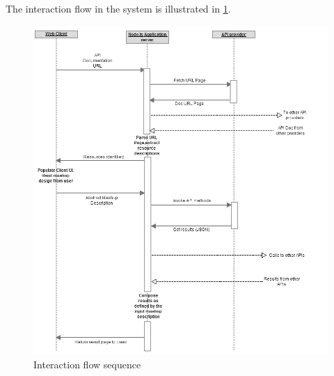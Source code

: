 \documentclass[journal]{IEEEtran}
\begin{document}
The interaction flow in the system is illustrated in \ref{fig:interaction_flow}.
\begin{figure}[!ht]
   \centering
    \includegraphics[width=6in] {images/seq.png}
    \caption{Interaction flow sequence}
    \label{fig:interaction_flow}
\end{figure}
\end{document}

